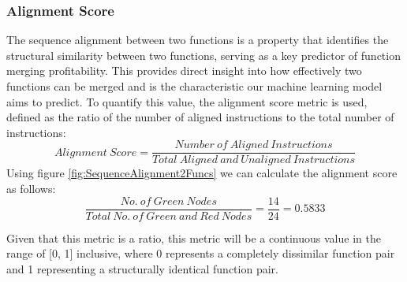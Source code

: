 \subsubsection{Alignment Score} \label{METRIC:AlignmentScore}
The sequence alignment between two functions is a property that identifies the structural similarity between two functions, serving as a key predictor of function merging profitability. This provides direct insight into how effectively two functions can be merged and is the characteristic our machine learning model aims to predict.
To quantify this value, the alignment score metric is used, defined as the ratio of the number of aligned instructions to the total number of instructions:
$$Alignment\ Score = \frac{Number\ of\ Aligned\ Instructions}{Total\ Aligned\ and\ Unaligned\ Instructions}$$
Using figure \ref{fig:SequenceAlignment2Funcs} we can calculate the alignment score as follows:
$$\frac{No.\ of\ Green\ Nodes}{Total\ No.\ of\ Green\ and\ Red\ Nodes}=\frac{14}{24} = 0.5833$$

Given that this metric is a ratio, this metric will be a continuous value in the range of [0, 1] inclusive, where 0 represents a completely dissimilar function pair and 1 representing a structurally identical function pair.



